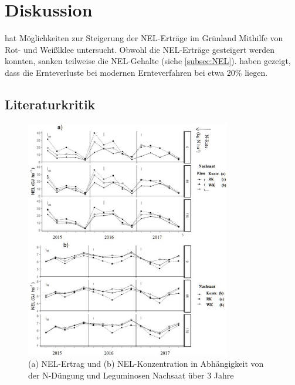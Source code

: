 
\section{Diskussion}
\label{sec:Disukussion}
\textcite[33-36]{weggler2050leguminosen} hat Möglichkeiten zur Steigerung der \ac{NEL}-Erträge im Grünland Mithilfe von Rot- und Weißlklee untersucht.
Obwohl die \ac{NEL}-Erträge gesteigert werden konnten, sanken teilweise die \ac{NEL}-Gehalte (siehe \cref{subsec:NEL}).
\textcite{fritz2018wirtschaftliche} haben gezeigt, dass die Ernteverluste bei modernen Ernteverfahren bei etwa 20\% liegen.


\subsection{Literaturkritik}
\label{sub:kritik}

\begin{figure}
	\centering
	\includegraphics[width=0.8\textwidth]{images/wegglerAbb1}
	\caption[(a) \acs{NEL}-Ertrag und (b) \acs{NEL}-Konzentration in Abhängigkeit von der N-Düngung und Leguminosen Nachsaat über 3 Jahre]{(a) \ac{NEL}-Ertrag und (b) \ac{NEL}-Konzentration in Abhängigkeit von der N-Düngung und Leguminosen Nachsaat über 3 Jahre \parencite[35]{weggler2050leguminosen}}
	\label{fig:wegglerAbb1}
\end{figure}




